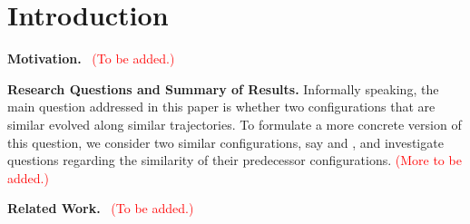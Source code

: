 \section{Introduction}
\label{sec:intro}

\noindent
\textbf{Motivation.}~ \textcolor{red}{(To be added.)}


\smallskip

\noindent
\textbf{Research Questions and Summary of Results.} Informally speaking,
the main question addressed in this paper is whether two configurations
that are similar evolved along similar trajectories.
To formulate a more concrete version of this question, we consider
two similar configurations, say \calcone{} and \calctwo, and
investigate questions regarding the similarity of their predecessor
configurations.
\textcolor{red}{(More to be added.)}


\smallskip

\noindent
\textbf{Related Work.}~
 \textcolor{red}{(To be added.)}
